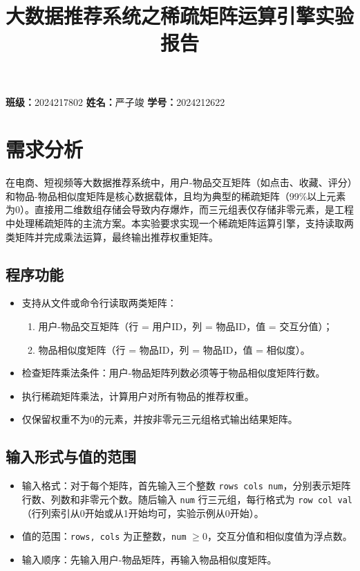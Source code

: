 \documentclass[UTF8]{ctexart}
\title{大数据推荐系统之稀疏矩阵运算引擎实验报告}
\author{}
\begin{document}
\maketitle

\begin{center}
    \textbf{班级：}2024217802 \quad \textbf{姓名：}严子竣 \quad \textbf{学号：}2024212622
\end{center}

\section{需求分析}
在电商、短视频等大数据推荐系统中，用户-物品交互矩阵（如点击、收藏、评分）和物品-物品相似度矩阵是核心数据载体，且均为典型的稀疏矩阵（99\%以上元素为0）。直接用二维数组存储会导致内存爆炸，而三元组表仅存储非零元素，是工程中处理稀疏矩阵的主流方案。本实验要求实现一个稀疏矩阵运算引擎，支持读取两类矩阵并完成乘法运算，最终输出推荐权重矩阵。

\subsection{程序功能}
\begin{itemize}
    \item 支持从文件或命令行读取两类矩阵：
        \begin{enumerate}
            \item 用户-物品交互矩阵（行 = 用户ID，列 = 物品ID，值 = 交互分值）；
            \item 物品相似度矩阵（行 = 物品ID，列 = 物品ID，值 = 相似度）。
        \end{enumerate}
    \item 检查矩阵乘法条件：用户-物品矩阵列数必须等于物品相似度矩阵行数。
    \item 执行稀疏矩阵乘法，计算用户对所有物品的推荐权重。
    \item 仅保留权重不为0的元素，并按非零元三元组格式输出结果矩阵。
\end{itemize}

\subsection{输入形式与值的范围}
\begin{itemize}
    \item 输入格式：对于每个矩阵，首先输入三个整数 \texttt{rows cols num}，分别表示矩阵行数、列数和非零元个数。随后输入 \texttt{num} 行三元组，每行格式为 \texttt{row col val}（行列索引从0开始或从1开始均可，实验示例从0开始）。
    \item 值的范围：\texttt{rows, cols} 为正整数，\texttt{num} $\ge 0$，交互分值和相似度值为浮点数。
    \item 输入顺序：先输入用户-物品矩阵，再输入物品相似度矩阵。
\end{itemize}
\end{document}
